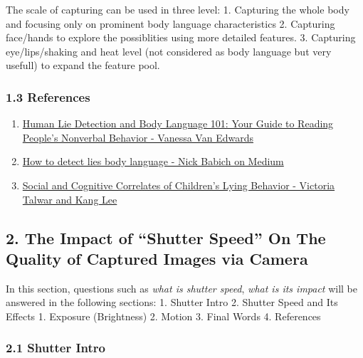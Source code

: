 \documentclass[11pt]{article}
\providecommand{\tightlist}{%
      \setlength{\itemsep}{0pt}\setlength{\parskip}{0pt}}
\begin{document}
The scale of capturing can be used in three level: 1. Capturing the
whole body and focusing only on prominent body language characteristics
2. Capturing face/hands to explore the possiblities using more detailed
features. 3. Capturing eye/lips/shaking and heat level (not considered
as body language but very usefull) to expand the feature pool.

\hypertarget{references}{%
\subsubsection{1.3 References}\label{references}}

\begin{enumerate}
\def\labelenumi{\arabic{enumi}.}
\tightlist
\item
  \href{https://www.amazon.com/Human-Lie-Detection-Body-Language/dp/1482040239}{Human
  Lie Detection and Body Language 101: Your Guide to Reading People's
  Nonverbal Behavior - Vanessa Van Edwards}
\item
  \href{https://medium.com/@101/how-to-detect-lies-body-language-5a184e90337b\#targetText=The\%20Nose\%20Touch\&targetText=However\%2C\%20the\%20hand\%20is\%20quickly,satisfied\%20with\%20rubbing\%20or\%20scratching.}{How
  to detect lies body language - Nick Babich on Medium}
\item
  \href{https://www.ncbi.nlm.nih.gov/pmc/articles/PMC3483871/}{Social
  and Cognitive Correlates of Children's Lying Behavior - Victoria
  Talwar and Kang Lee}
\end{enumerate}

    \hypertarget{the-impact-of-shutter-speed-on-the-quality-of-captured-images-via-camera}{%
\subsection{2. The Impact of ``Shutter Speed'' On The Quality of
Captured Images via
Camera}\label{the-impact-of-shutter-speed-on-the-quality-of-captured-images-via-camera}}

In this section, questions such as \emph{what is shutter speed},
\emph{what is its impact} will be answered in the following sections: 1.
Shutter Intro 2. Shutter Speed and Its Effects 1. Exposure (Brightness)
2. Motion 3. Final Words 4. References

\hypertarget{shutter-intro}{%
\subsubsection{2.1 Shutter Intro}\label{shutter-intro}}
\end{document}
